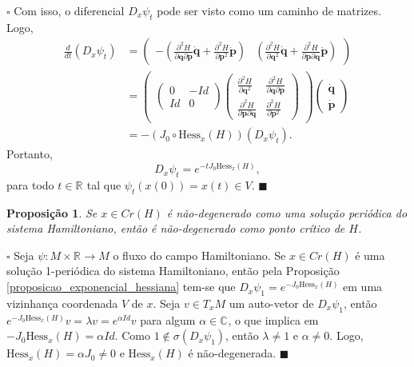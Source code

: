 \documentclass[12pt]{book}
\newtheorem{proposicao}[teorema]{Proposição}
\newenvironment{prova}[1]{$\square$ #1}{\hfill$\blacksquare$}
\newcommand{\complexo}[1]{\mathbb{C}^{#1}}
\newcommand{\derivada}[2]{\frac{d #1}{d #2}}
\newcommand{\derivadaparcialdois}[2]{\frac{\partial^{2} #1}{\partial #2^{2}}}
\newcommand{\derivadaparcialdoisdois}[3]{\frac{\partial^{2} #1}{\partial #2 \partial#3}}
\newcommand{\espacotangenteponto}[2]{T_{#1}#2}
\newcommand{\espectrooperador}[1]{\sigma(#1)}
\newcommand{\estruturacomplexa}{J_{0}}
\newcommand{\hessianaponto}[2]{\text{Hess}_{#1}(#2)}
\newcommand{\pontoscriticos}[1]{\textit{Cr}(#1)}
\newcommand{\real}[1]{\mathbb{R}^{#1}}
\newcommand{\reta}{\real{}}
\begin{document}
\begin{prova}
		Com isso, o diferencial $D_{x}\psi_{t}$ pode ser visto como um caminho de matrizes. Logo,
		$$
		\begin{aligned}
		\derivada{}{t}(D_{x}\psi_{t})
		&=
		\left(
		\begin{array}{cc}
		-(\derivadaparcialdoisdois{H}{\textbf{q}}{\textbf{p}}\dot{\textbf{q}}+\derivadaparcialdois{H}{\textbf{p}}\dot{\textbf{p}}) & 
		(\derivadaparcialdois{H}{\textbf{q}}\dot{\textbf{q}}+\derivadaparcialdoisdois{H}{\textbf{p}}{\textbf{q}}\dot{\textbf{p}})
		\end{array}
		\right)
		\\
		&=
		\left(
		\begin{array}{c}
		\left(
		\begin{array}{cc}
		0& -Id
		\\
		Id & 0
		\end{array}
		\right)
		\left(
		\begin{array}{cc}
		\derivadaparcialdois{H}{\textbf{q}} & 
		\derivadaparcialdoisdois{H}{\textbf{q}}{\textbf{p}}
		\\
		\derivadaparcialdoisdois{H}{\textbf{p}}{\textbf{q}} & \derivadaparcialdois{H}{\textbf{p}}
		\end{array}
		\right)
		\end{array}
		\right)
		\left(
		\begin{array}{c}
		\dot{\textbf{q}}
		\\
		\dot{\textbf{p}}
		\end{array}
		\right)
		\\
		&= -(\estruturacomplexa\circ \hessianaponto{x}{H})(	D_{x}\psi_{t}).
		\end{aligned}
		$$
		Portanto,
		$$
		D_{x}\psi_{t} = e^{-t\estruturacomplexa \hessianaponto{x}{H}},
		$$
		para todo $t\in \reta$ tal que $\psi_{t}(x(0))=x(t)\in V$.
	\end{prova}
	
	\begin{proposicao}
		Se $x \in \pontoscriticos{H}$ é não-degenerado como uma solução periódica do sistema Hamiltoniano, então é não-degenerado como ponto crítico de $H$.
	\end{proposicao}
	\begin{prova}
		Seja $\psi:M\times \reta\to M$ o fluxo do campo Hamiltoniano. Se $x\in \pontoscriticos{H}$ é uma solução 1-periódica do sistema Hamiltoniano, então pela Proposição \ref{proposicao_exponencial_hessiana} tem-se que $D_{x}\psi_{1}=e^{-\estruturacomplexa \hessianaponto{x}{H}}$ em uma vizinhança coordenada $V$ de $x$. Seja $v\in \espacotangenteponto{x}{M}$ um auto-vetor de $D_{x}\psi_{1}$, então $e^{-\estruturacomplexa \hessianaponto{x}{H}}v=\lambda v = e^{\alpha Id}v$ para algum $\alpha \in \complexo{}$, o que implica em $-\estruturacomplexa \hessianaponto{x}{H} = \alpha Id$. Como $1\notin \espectrooperador{D_{x}\psi_{1}}$, então $\lambda \neq 1 $ e $\alpha\neq 0$. Logo, $\hessianaponto{x}{H} =\alpha\estruturacomplexa \neq 0$ e $\hessianaponto{x}{H}$ é não-degenerada.
	\end{prova}
	
\end{document}
